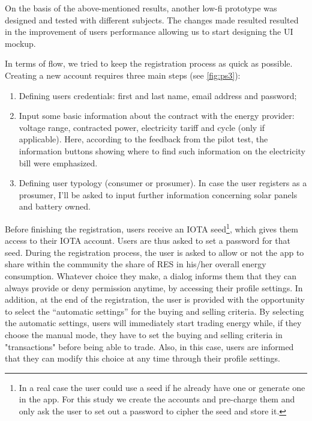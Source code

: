 On the basis of the above-mentioned results, another low-fi prototype was designed and tested with different subjects. The changes made resulted resulted in the improvement of users performance allowing us to start designing the \ac{UI} mockup.

In terms of flow, we tried to keep the registration process as quick as possible. Creating a new account requires three main steps (see \cref{fig:ps3}):
\begin{enumerate}
    \item Defining users credentials: first and last name, email address and password;
    \item Input some basic information about the contract with the energy provider: voltage range, contracted power, electricity tariff and cycle (only if applicable). Here, according to the feedback from the pilot test, the information buttons showing where to find such information on the electricity bill were emphasized.
    \item Defining user typology (consumer or prosumer). In case the user registers as a prosumer, I’ll be asked to input further information concerning solar panels and battery owned.
\end{enumerate}


Before finishing the registration, users receive an IOTA seed\footnote{In a real case the user could use a seed if he already have one or generate one in the app. For this study we create the accounts and pre-charge them and only ask the user to set out a password to cipher the seed and store it.}, which gives them access to their IOTA account. Users are thus asked to set a password for that seed.
During the registration process, the user is asked to allow or not the app to share within the community the share of RES in his/her overall energy consumption. Whatever choice they make, a dialog informs them that they can always provide or deny permission anytime, by accessing their profile settings. In addition, at the end of the registration, the user is provided with the opportunity to select the “automatic settings” for the buying and selling criteria. By selecting the automatic settings, users will immediately start trading energy while, if they choose the manual mode, they have to set the buying and selling criteria in "transactions" before being able to trade. Also, in this case, users are informed that they can modify this choice at any time through their profile settings.

